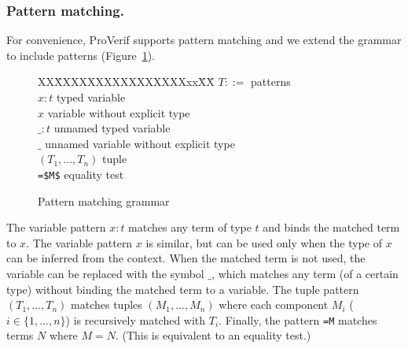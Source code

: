 \documentclass{book}
\newcommand{\tblue}[1]{\textcolor{blue}{REMARK: \emph{#1}}}
\renewcommand{\marginpar}[1]{\tblue{#1}}
\begin{document}
\subsubsection{Pattern matching.}

For convenience, ProVerif supports pattern matching and we extend the grammar to include patterns (Figure~\ref{fig:patternGrammar}).
%
\begin{figure}
\begin{center}
\begin{minipage}{\textwidth}
\begin{tabbing}
   XX\=XXXXXXXXXXXXXXXXxx\=XX\=\kill     %
$T ::=$ \>    							\> patterns 					\\
\> $x:t$									\>\> typed variable			\\
\> $x$                                                          \>\> variable without explicit type\\
\> $\_:t$									\>\> unnamed typed variable\\
\> $\_$									\>\> unnamed variable without explicit type\\
\> $(T_1,...,T_n)$						\>\> tuple					\\
\> \lstinline!=$M$!								\>\> equality test%
%
\end{tabbing}%
\end{minipage}%
\end{center}%
\caption{Pattern matching grammar}%
\label{fig:patternGrammar}%
\end{figure}
%
The variable pattern $x:t$ matches any term of type $t$ and binds the matched term to $x$. The variable pattern $x$ is similar, but can be used only when the type of $x$ can be inferred from the context. When the matched term is not used, the variable can be replaced with the symbol $\_$, which matches any term (of a certain type) without binding the matched term to a variable. The tuple pattern $(T_1,\ldots,T_n)$ matches tuples $(M_1,\ldots,M_n)$ where each component $M_i$ ($i \in \{1,\ldots,n\}$) is recursively matched with $T_i$.
Finally, the pattern \lstinline!=M! matches terms $N$ where $M = N$. (This is equivalent to an equality test.)

\end{document}
